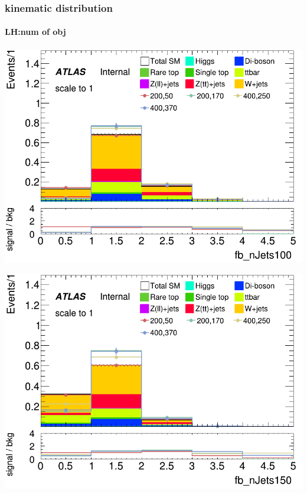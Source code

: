 \documentclass[usenames,dvipsnames]{beamer}
\begin{document}
\begin{frame}
	\frametitle{kinematic distribution}
	\framesubtitle{LH:num of obj}
    \begin{minipage}{0.32\textwidth}
        \centering
        \includegraphics[width=\textwidth]{graphics/LH_met_sig/LH_fb_nJets100_norm.png}
    \end{minipage}
    \hfill
    \begin{minipage}{0.32\textwidth}
        \centering
        \includegraphics[width=\textwidth]{graphics/LH_met_sig/LH_fb_nJets150_norm.png}

\end{minipage}
\end{frame}
\end{document}
